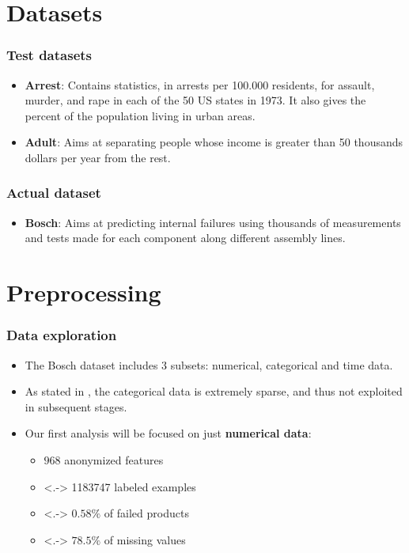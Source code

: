 \documentclass{beamer}
\begin{document}
\section{Datasets}
\begin{frame}
  \frametitle{Test datasets}
  \begin{itemize}[<+->]
    \item \textbf{Arrest}: Contains statistics, in arrests per 100.000 residents, for assault, murder, and rape in each of the 50 US states in 1973. 
          It also gives the percent of the population living in urban areas.
    \item \textbf{Adult}: Aims at separating people whose income is greater than 50 thousands dollars per year from the rest.
  \end{itemize}	
\end{frame}

\begin{frame}
  \frametitle{Actual dataset}
  \begin{itemize}[<+->]
    \item \textbf{Bosch}: Aims at predicting internal failures using thousands of measurements and tests made for each component along different assembly lines.
  \end{itemize}
\end{frame}

\section{Preprocessing}
\begin{frame}
  \frametitle{Data exploration}
  \begin{itemize}[<+->]
    \item The Bosch dataset includes 3 subsets: numerical, categorical and time data.
    \item As stated in \cite{predict-failures}, the categorical data is extremely sparse, and thus not exploited in subsequent stages.
    \item Our first analysis will be focused on just \textbf{numerical data}:
    \begin{itemize} 
      \item $968$ anonymized features
      \item<.-> \num{1183747} labeled examples
      \item<.-> $0.58\%$ of failed products
      \item<.-> $78.5\%$ of missing values
    \end{itemize}
  \end{itemize}
\end{frame}
\end{document}
